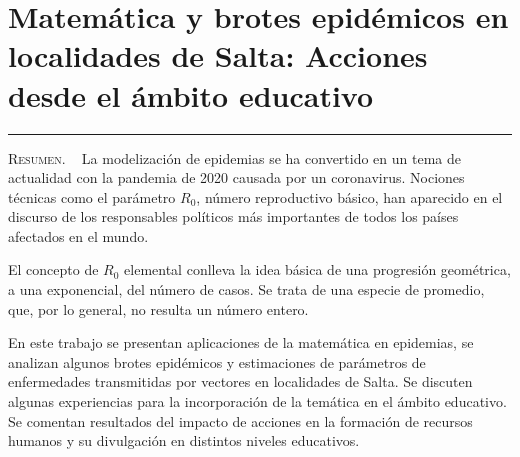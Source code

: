 \thispagestyle{portadapage}
\setcounter{subsection}{0}
\setcounter{subsubsection}{0}
\setcounter{actividad}{0}
\setcounter{actividad_previa}{0}
\setcounter{actividad_entre}{0}
\renewcommand{\articulotipo}{Comunicación breve}
\renewcommand{\articulotitulo}{Matemática y brotes epidémicos en localidades de Salta: Acciones desde el ámbito educativo}
\renewcommand{\articulotitulocorto}{Matemática y brotes epidémicos en localidades de Salta: Acciones desde el ámbito educativo}
\section{\articulotitulo}

\noindent\rule{\linewidth}{2pt}

\vspace{0.25cm}

\begin{flushright}
	\vspace{1em}
\end{flushright}

\vspace{0.5cm}

\begin{center}
	\begin{minipage}{0.75\linewidth} \small
		\textsc{Resumen}. ~
		La modelización de epidemias se ha convertido en un tema de actualidad con la pandemia de 2020 causada por un coronavirus. Nociones técnicas como el parámetro $R_0$, número reproductivo básico, han aparecido en el discurso de los responsables políticos más importantes de todos los países afectados en el mundo.
		
		El concepto de $R_0$ elemental conlleva la idea básica de una progresión geométrica, a una exponencial, del número de casos. Se trata de una especie de promedio, que, por lo general, no resulta un número entero.
		
		En este trabajo se presentan aplicaciones de la matemática en epidemias, se analizan algunos brotes epidémicos y estimaciones de parámetros de enfermedades transmitidas por vectores en localidades de Salta. Se discuten algunas experiencias para la incorporación de la temática en el ámbito educativo. Se comentan resultados del impacto de acciones en la formación de recursos humanos y su divulgación en distintos niveles educativos.
	\end{minipage}
\end{center}

